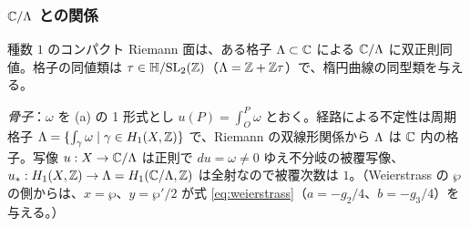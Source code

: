 \subsubsection*{$\mathbb C/\Lambda$ との関係}
\begin{thm}[一意化（$g=1$）]\label{thm:uniformg1}
種数 $1$ のコンパクト Riemann 面は、ある格子 $\Lambda\subset\mathbb C$ による $\mathbb C/\Lambda$ に双正則同値。格子の同値類は $\tau\in\mathbb H/\mathrm{SL}_2(\mathbb Z)$（$\Lambda=\mathbb Z+\mathbb Z\tau$）で、楕円曲線の同型類を与える。
\end{thm}
\emph{骨子}：$\omega$ を (a) の 1 形式とし $u(P)=\int_O^P\omega$ とおく。経路による不定性は周期格子 $\Lambda=\{\int_\gamma\omega\mid\gamma\in H_1(X,\mathbb Z)\}$ で、Riemann の双線形関係から $\Lambda$ は $\mathbb C$ 内の格子。写像 $u:X\to\mathbb C/\Lambda$ は正則で $du=\omega\ne0$ ゆえ不分岐の被覆写像、$u_*:H_1(X,\mathbb Z)\to\Lambda=H_1(\mathbb C/\Lambda,\mathbb Z)$ は全射なので被覆次数は $1$。（Weierstrass の $\wp$ の側からは、$x=\wp$、$y=\wp'/2$ が式 \eqref{eq:weierstrass}（$a=-g_2/4$、$b=-g_3/4$）を与える。）

